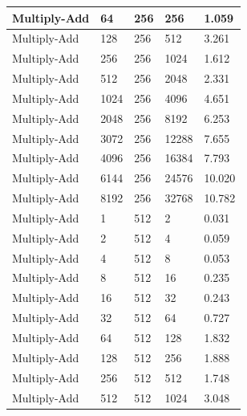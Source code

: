 \documentclass{article}
\begin{document}
\begin{longtable}{|l|l|l|l|l|}
Multiply-Add       & 64   & 256         & 256               & 1.059             \\ \hline
Multiply-Add       & 128  & 256         & 512               & 3.261             \\ \hline
Multiply-Add       & 256  & 256         & 1024              & 1.612             \\ \hline
Multiply-Add       & 512  & 256         & 2048              & 2.331             \\ \hline
Multiply-Add       & 1024 & 256         & 4096              & 4.651             \\ \hline
Multiply-Add       & 2048 & 256         & 8192              & 6.253             \\ \hline
Multiply-Add       & 3072 & 256         & 12288             & 7.655             \\ \hline
Multiply-Add       & 4096 & 256         & 16384             & 7.793             \\ \hline
Multiply-Add       & 6144 & 256         & 24576             & 10.020            \\ \hline
Multiply-Add       & 8192 & 256         & 32768             & 10.782            \\ \hline
Multiply-Add       & 1    & 512         & 2                 & 0.031             \\ \hline
Multiply-Add       & 2    & 512         & 4                 & 0.059             \\ \hline
Multiply-Add       & 4    & 512         & 8                 & 0.053             \\ \hline
Multiply-Add       & 8    & 512         & 16                & 0.235             \\ \hline
Multiply-Add       & 16   & 512         & 32                & 0.243             \\ \hline
Multiply-Add       & 32   & 512         & 64                & 0.727             \\ \hline
Multiply-Add       & 64   & 512         & 128               & 1.832             \\ \hline
Multiply-Add       & 128  & 512         & 256               & 1.888             \\ \hline
Multiply-Add       & 256  & 512         & 512               & 1.748             \\ \hline
Multiply-Add       & 512  & 512         & 1024              & 3.048             \\ \hline

\end{longtable}
\end{document}
